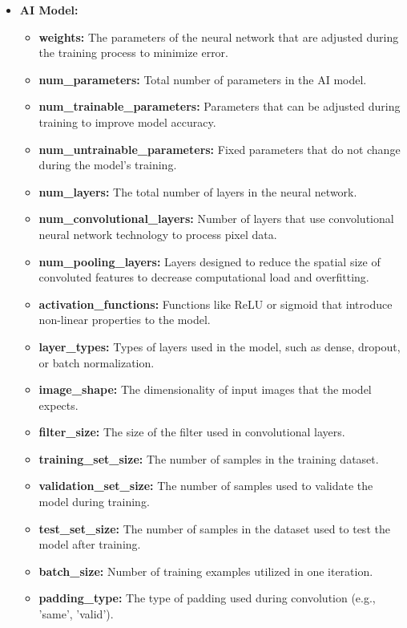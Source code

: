 \begin{itemize}
    \item \textbf{AI Model:}
        \begin{itemize}
            \item \textbf{weights:} The parameters of the neural network that are adjusted during the training process to minimize error.
            \item \textbf{num\_parameters:} Total number of parameters in the AI model.
            \item \textbf{num\_trainable\_parameters:} Parameters that can be adjusted during training to improve model accuracy.
            \item \textbf{num\_untrainable\_parameters:} Fixed parameters that do not change during the model's training.
            \item \textbf{num\_layers:} The total number of layers in the neural network.
            \item \textbf{num\_convolutional\_layers:} Number of layers that use convolutional neural network technology to process pixel data.
            \item \textbf{num\_pooling\_layers:} Layers designed to reduce the spatial size of convoluted features to decrease computational load and overfitting.
            \item \textbf{activation\_functions:} Functions like ReLU or sigmoid that introduce non-linear properties to the model.
            \item \textbf{layer\_types:} Types of layers used in the model, such as dense, dropout, or batch normalization.
            \item \textbf{image\_shape:} The dimensionality of input images that the model expects.
            \item \textbf{filter\_size:} The size of the filter used in convolutional layers.
            \item \textbf{training\_set\_size:} The number of samples in the training dataset.
            \item \textbf{validation\_set\_size:} The number of samples used to validate the model during training.
            \item \textbf{test\_set\_size:} The number of samples in the dataset used to test the model after training.
            \item \textbf{batch\_size:} Number of training examples utilized in one iteration.
            \item \textbf{padding\_type:} The type of padding used during convolution (e.g., 'same', 'valid').

\end{itemize}
\end{itemize}
